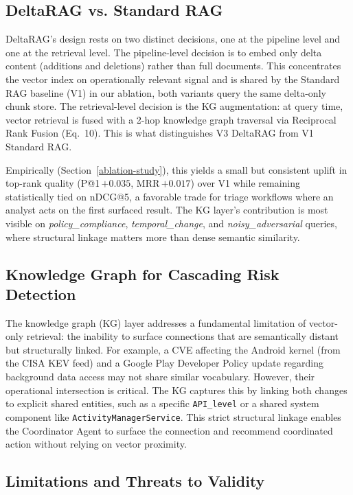 \documentclass[
]{article}
\begin{document}
\subsection{DeltaRAG vs. Standard RAG}\label{deltarag-vs.-standard-rag}

DeltaRAG's design rests on two distinct decisions, one at the pipeline
level and one at the retrieval level. The pipeline-level decision is to
embed only delta content (additions and deletions) rather than full
documents. This concentrates the vector index on operationally
relevant signal and is shared by the Standard RAG baseline (V1) in our
ablation, both variants query the same delta-only chunk store.
The retrieval-level decision is the KG augmentation: at query time,
vector retrieval is fused with a 2-hop knowledge graph traversal via
Reciprocal Rank Fusion (Eq.~10). This is what distinguishes V3
DeltaRAG from V1 Standard RAG.

Empirically (Section~\ref{ablation-study}), this yields a small but
consistent uplift in top-rank quality (P@1\,$+0.035$, MRR\,$+0.017$)
over V1 while remaining statistically tied on nDCG@5, a favorable
trade for triage workflows where an analyst acts on the first surfaced
result. The KG layer's contribution is most visible on
\textit{policy\_compliance}, \textit{temporal\_change}, and
\textit{noisy\_adversarial} queries, where structural linkage matters
more than dense semantic similarity.

\subsection{Knowledge Graph for Cascading Risk Detection}\label{graph-rag-for-cascading-risk-detection}

The knowledge graph (KG) layer addresses a fundamental limitation of
vector-only retrieval: the inability to surface connections that are
semantically distant but structurally linked. For example, a CVE
affecting the Android kernel (from the CISA KEV feed) and a Google
Play Developer Policy update regarding background data access may not
share similar vocabulary. However, their operational intersection is
critical. The KG captures this by linking both changes to explicit
shared entities, such as a specific \texttt{API\_level} or a shared
system component like \texttt{ActivityManagerService}. This strict
structural linkage enables the Coordinator Agent to surface the
connection and recommend coordinated action without relying on vector
proximity.

\subsection{Limitations and Threats to Validity}\label{limitations-and-threats-to-validity}
\end{document}
